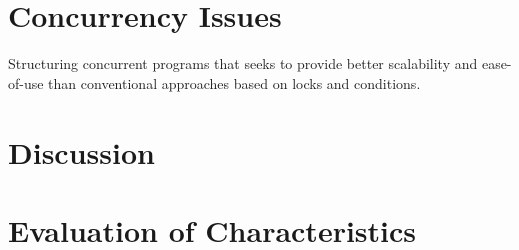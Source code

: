 \section{Concurrency Issues}
\label{sec:stm_issues}
Structuring concurrent programs that seeks to provide better scalability and ease-of-use than conventional approaches based on locks and conditions.

\section{Discussion}
\label{sec:stm_discussion}


\section{Evaluation of Characteristics}
\label{sec:stm_eval}

\worksheetend